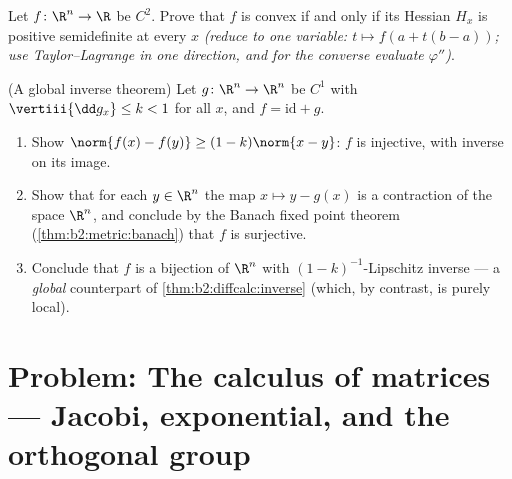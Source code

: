 \begin{exercise}[$\star\star$]\label{exo:b2:diffcalc:11}
Let $f \colon \R^n \to \R$ be $C^2$. Prove that $f$ is convex if
and only if its Hessian $H_x$ is positive semidefinite at every
$x$ \emph{(reduce to one variable: $t \mapsto f(a + t(b-a))$;
use Taylor--Lagrange in one direction, and for the converse
evaluate $\varphi''$)}.
\end{exercise}

\begin{exercise}[$\star\star\star$]\label{exo:b2:diffcalc:12}
(A global inverse theorem) Let $g \colon \R^n \to \R^n$ be $C^1$
with $\vertiii{\dd g_x} \leq k < 1$ for all $x$, and $f =
\mathrm{id} + g$.
\begin{enumerate}
  \item Show $\norm{f(x) - f(y)} \geq (1 - k)\norm{x - y}$: $f$
        is injective, with  inverse on its image.
  \item Show that for each $y \in \R^n$ the map $x \mapsto y -
        g(x)$ is a contraction of the  space $\R^n$,
        and conclude by the Banach fixed point theorem
        (\cref{thm:b2:metric:banach}) that $f$ is surjective.
  \item Conclude that $f$ is a bijection of $\R^n$ with
        $(1-k)^{-1}$-Lipschitz inverse --- a \emph{global}
        counterpart of \cref{thm:b2:diffcalc:inverse} (which,
        by contrast, is purely local).
\end{enumerate}
\end{exercise}

\section{Problem: The calculus of matrices --- Jacobi,
exponential, and the orthogonal group}

